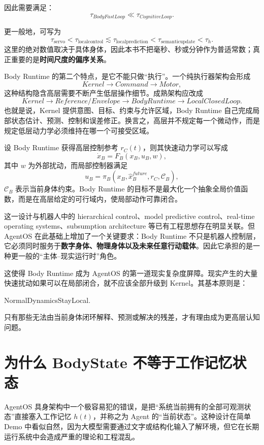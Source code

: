因此需要满足：
\[
\boxed{
\tau_{BodyFastLoop}
\ll
\tau_{CognitiveLoop}.
}
\]

更一般地，可写为
\[
\tau_{\mathrm{servo}}
<
\tau_{\mathrm{localcontrol}}
\lesssim
\tau_{\mathrm{localprediction}}
<
\tau_{\mathrm{semanticupdate}}
<
\tau_h.
\]
这里的绝对数值取决于具体身体，因此本书不把毫秒、秒或分钟作为普适常数；真正重要的是\textbf{时间尺度的偏序关系}。

Body Runtime 的第二个特点，是它不能只做“执行”。一个纯执行器架构会形成
\[
Kernel
\rightarrow
Command
\rightarrow
Motor,
\]
这种结构隐含高层需要不断产生低层操作细节。成熟架构应改成
\[
Kernel
\rightarrow
Reference/Envelope
\rightarrow
BodyRuntime
\rightarrow
LocalClosedLoop.
\]
也就是说，Kernel 提供意图、目标、约束与允许区域，Body Runtime 自己完成局部状态估计、预测、控制和误差修正。换言之，高层并不规定每一个微动作，而是规定低层动力学必须维持在哪一个可接受区域。

设 Body Runtime 获得高层控制参考 $r_C(t)$，则其快速动力学可以写成
\[
\dot x_B
=
F_B
\left(
x_B,
u_B,
w
\right),
\]
其中 $w$ 为外部扰动，而局部控制器满足
\[
u_B
=
\pi_B
\left(
x_B,
\hat x_{B}^{future},
r_C,
\mathcal C_B
\right),
\]
$\mathcal C_B$ 表示当前身体约束。Body Runtime 的目标不是最大化一个抽象全局价值函数，而是在高层给定的可行域内，使局部动作可靠闭合。

这一设计与机器人中的 hierarchical control、model predictive control、real-time operating systems、subsumption architecture 等已有工程思想存在明显关联。但 AgentOS 在此基础上增加了一个关键要求：Body Runtime 不只是机器人控制层，它必须同时服务于\textbf{数字身体、物理身体以及未来任意行动载体}。因此它承担的是一种更一般的“主体--现实运行时”角色。

这使得 Body Runtime 成为 AgentOS 的第一道现实复杂度屏障。现实产生的大量快速扰动如果可以在局部闭合，就不应该全部升级到 Kernel。其基本原则是：
\begin{statementbox}
NormalDynamicsStayLocal.
\end{statementbox}
只有那些无法由当前身体闭环解释、预测或解决的残差，才有理由成为更高层认知问题。

\section{为什么 BodyState 不等于工作记忆状态}

AgentOS 具身架构中一个极容易犯的错误，是把“系统当前拥有的全部可观测状态”直接塞入工作记忆 $h(t)$，并称之为 Agent 的“当前状态”。这种设计在简单 Demo 中看似自然，因为大模型需要通过文字或结构化输入了解环境，但它在长期运行系统中会造成严重的理论和工程混乱。

